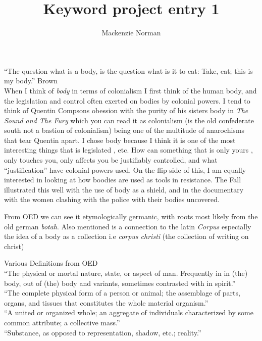 \documentclass{article}
\title{Keyword project entry 1}
\author{Mackenzie Norman}
\date{}
\begin{document}
\maketitle
``The question what is a body, is the question what is it to eat: Take, eat; this is my body.'' Brown \\


When I think of \textit{body} in terms of colonialism I first think of the human body, and the legislation and control often exerted on bodies by colonial powers. I tend to think of Quentin Compsons obession with the purity of his sisters body in \textit{The Sound and The Fury} which you can read it as colonialism (is the old confederate south not a bastion of colonialism) being one of the multitude of anarochisms that tear Quentin apart. I chose body because I think it is one of the most interesting things that is legislated , etc. How can something that is only yours , only touches you, only affects you be justifiably controlled, and what ``justification'' have colonial powers used. 
On the flip side of this, I am equally interested in looking at how boodies are used as tools in resistance. The Fall illustrated this well with the use of body as a shield, and in the documentary with the women clashing with the police with their bodies uncovered.


From OED we can see it etymologically germanic, with roots most likely from the old german \textit{botah}. Also mentioned is a connection to the latin \textit{Corpus} especially the idea of a body as a collection i.e \textit{corpus christi} (the collection of writing on christ)

Various Definitions from OED\\

``The physical or mortal nature, state, or aspect of man. Frequently in in (the) body, out of (the) body and variants, sometimes contrasted with in spirit.''\\

``The complete physical form of a person or animal; the assemblage of parts, organs, and tissues that constitutes the whole material organism.''\\

``A united or organized whole; an aggregate of individuals characterized by some common attribute; a collective mass.''\\

``Substance, as opposed to representation, shadow, etc.; reality.''\\
\end{document}
